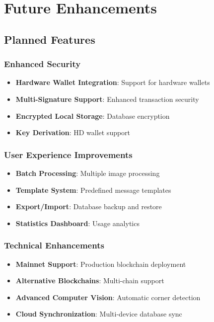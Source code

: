 \documentclass[12pt,a4paper]{article}
\begin{document}
\section{Future Enhancements}

\subsection{Planned Features}

\subsubsection{Enhanced Security}
\begin{itemize}
    \item \textbf{Hardware Wallet Integration}: Support for hardware wallets
    \item \textbf{Multi-Signature Support}: Enhanced transaction security
    \item \textbf{Encrypted Local Storage}: Database encryption
    \item \textbf{Key Derivation}: HD wallet support
\end{itemize}

\subsubsection{User Experience Improvements}
\begin{itemize}
    \item \textbf{Batch Processing}: Multiple image processing
    \item \textbf{Template System}: Predefined message templates
    \item \textbf{Export/Import}: Database backup and restore
    \item \textbf{Statistics Dashboard}: Usage analytics
\end{itemize}

\subsubsection{Technical Enhancements}
\begin{itemize}
    \item \textbf{Mainnet Support}: Production blockchain deployment
    \item \textbf{Alternative Blockchains}: Multi-chain support
    \item \textbf{Advanced Computer Vision}: Automatic corner detection
    \item \textbf{Cloud Synchronization}: Multi-device database sync
\end{itemize}
\end{document}
